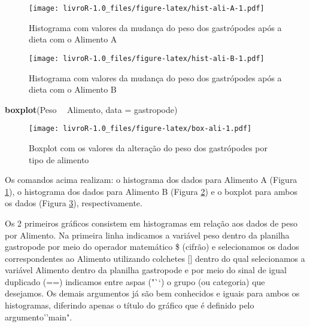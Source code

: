 \documentclass[titlepage, oneside, openany, a4paper]{book}
\newenvironment{Shaded}{\begin{snugshade}}{\end{snugshade}}
\newcommand{\DataTypeTok}[1]{\textcolor[rgb]{0.13,0.29,0.53}{#1}}
\newcommand{\KeywordTok}[1]{\textcolor[rgb]{0.13,0.29,0.53}{\textbf{#1}}}
\newcommand{\NormalTok}[1]{#1}
\newcommand{\OperatorTok}[1]{\textcolor[rgb]{0.81,0.36,0.00}{\textbf{#1}}}
\newcommand{\StringTok}[1]{\textcolor[rgb]{0.31,0.60,0.02}{#1}}
\begin{document}
\begin{figure}
\centering
\texttt{[image: livroR-1.0\_files/figure-latex/hist-ali-A-1.pdf]}
\caption{\label{fig:hist-ali-A}Histograma com valores da mudança do peso dos gastrópodes após a dieta com o Alimento A}
\end{figure}

\begin{Shaded}
\end{Shaded}

\begin{figure}
\centering
\texttt{[image: livroR-1.0\_files/figure-latex/hist-ali-B-1.pdf]}
\caption{\label{fig:hist-ali-B}Histograma com valores da mudança do peso dos gastrópodes após a dieta com o Alimento B}
\end{figure}

\begin{Shaded}
\begin{Highlighting}[]
\KeywordTok{boxplot}\NormalTok{(Peso }\OperatorTok{~}\StringTok{ }\NormalTok{Alimento, }\DataTypeTok{data =}\NormalTok{ gastropode)}
\end{Highlighting}
\end{Shaded}

\begin{figure}
\centering
\texttt{[image: livroR-1.0\_files/figure-latex/box-ali-1.pdf]}
\caption{\label{fig:box-ali}Boxplot com os valores da alteração do peso dos gastrópodes por tipo de alimento}
\end{figure}

Os comandos acima realizam: o histograma dos dados para Alimento A (Figura \ref{fig:hist-ali-A}), o histograma dos dados para Alimento B (Figura \ref{fig:hist-ali-B}) e o boxplot para ambos os dados (Figura \ref{fig:box-ali}), respectivamente.

Os 2 primeiros gráficos consistem em histogramas em relação aos dados de peso por Alimento. Na primeira linha indicamos a variável peso dentro da planilha gastropode por meio do operador matemático \$ (cifrão) e selecionamos os dados correspondentes ao Alimento utilizando colchetes {[}{]} dentro do qual selecionamos a variável Alimento dentro da planilha gastropode e por meio do sinal de igual duplicado (==) indicamos entre aspas ("``) o grupo (ou categoria) que desejamos. Os demais argumentos já são bem conhecidos e iguais para ambos os histogramas, diferindo apenas o título do gráfico que é definido pelo argumento''main".
\end{document}
